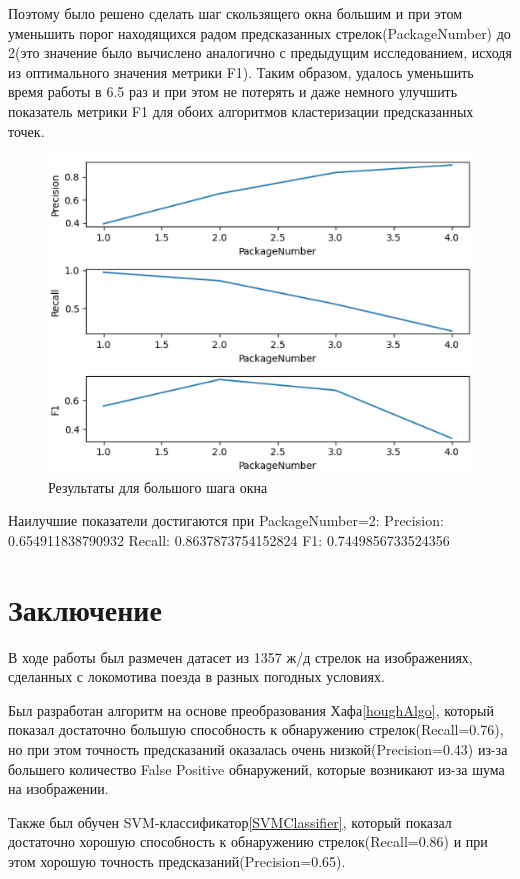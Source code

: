 Поэтому было решено сделать шаг скользящего окна большим и при этом уменьшить порог находящихся радом предсказанных стрелок(PackageNumber) до 2(это значение было вычислено аналогично с предыдущим исследованием, исходя из оптимального значения метрики F1). 
Таким образом, удалось уменьшить время работы в 6.5 раз и при этом не потерять и даже немного улучшить показатель метрики F1 для обоих алгоритмов кластеризации предсказанных точек.
\begin{figure}[h!]
	\centering
	\includegraphics[width=0.7\linewidth]{pictures/screenshot23238}
	\caption{Результаты для большого шага окна}
	\label{fig:screenshot23238}
\end{figure}\newline
Наилучшие показатели достигаются при PackageNumber=2:\newline
Precision: 0.654911838790932\newline
Recall: 0.8637873754152824\newline
F1: 0.7449856733524356


\chapter{Заключение}
В ходе работы был размечен датасет из 1357 ж/д стрелок на изображениях, сделанных с локомотива поезда в разных погодных условиях. 

Был разработан алгоритм на основе преобразования Хафа\ref{houghAlgo}, который показал достаточно большую способность к обнаружению стрелок(Recall=0.76), но при этом точность предсказаний оказалась очень низкой(Precision=0.43) из-за большего количество False Positive обнаружений, которые возникают из-за шума на изображении.

Также был обучен SVM-классификатор\ref{SVMClassifier}, который показал достаточно хорошую способность к обнаружению стрелок(Recall=0.86) и при этом хорошую точность предсказаний(Precision=0.65). 


